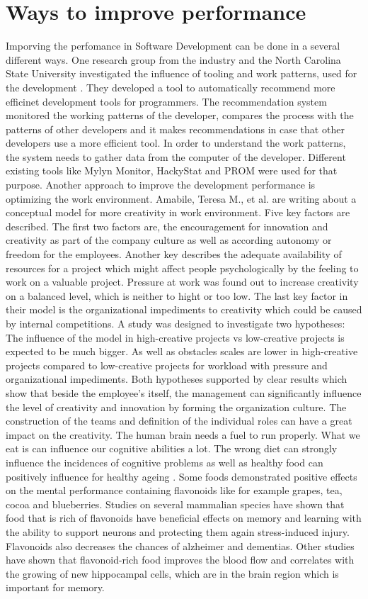 \section{Ways to improve performance}
Imporving the perfomance in Software Development can be done in a several different ways. One research group from the industry and the North Carolina State University investigated the influence of tooling and work patterns, used for the development \cite{snipes2013towards}. They developed a tool to automatically recommend more efficinet development tools for programmers. The recommendation system monitored the working patterns of the developer, compares the process with the patterns of other developers and it makes recommendations in case that other developers use a more efficient tool.
In order to understand the work patterns, the system needs to gather data from the computer of the developer. Different existing tools like Mylyn Monitor, HackyStat and PROM were used for that purpose.
Another approach to improve the development performance is optimizing the work environment. Amabile, Teresa M., et al. \cite{amabile1996assessing} are writing about a conceptual model for more creativity in work environment. Five key factors are described. The first two factors are, the encouragement for innovation and creativity as part of the company culture as well as according autonomy or freedom for the employees. Another key describes the adequate availability of resources for a project which might affect people psychologically by the feeling to work on a valuable project. Pressure at work was found out to increase creativity on a balanced level, which is neither to hight or too low. The last key factor in their model is the organizational impediments to creativity which could be caused by internal competitions.
A study was designed to investigate two hypotheses: The influence of the model in high-creative projects vs low-creative projects is expected to be much bigger. As well as obstacles scales are lower in high-creative projects compared to low-creative projects for workload with pressure and organizational impediments.
Both hypotheses supported by clear results which show that beside the employee's itself, the management can significantly influence the level of creativity and innovation by forming the organization culture. The construction of the teams and definition of the individual roles can have a great impact on the creativity. 
The human brain needs a fuel to run properly. What we eat is can influence our cognitive abilities a lot. The wrong diet can strongly influence the incidences of cognitive problems as well as healthy food can positively influence for healthy ageing \cite{spencer2008food}. Some foods demonstrated positive effects on the mental performance containing flavonoids like for example grapes, tea, cocoa and blueberries. 
Studies on several mammalian species have shown that food that is rich of flavonoids have beneficial effects on memory and learning with the ability to support neurons and protecting them again stress-induced injury.
Flavonoids also decreases the chances of alzheimer and dementias. Other studies have shown that flavonoid-rich food improves the blood flow and correlates with the growing of new hippocampal cells, which are in the brain region which is important for memory.
